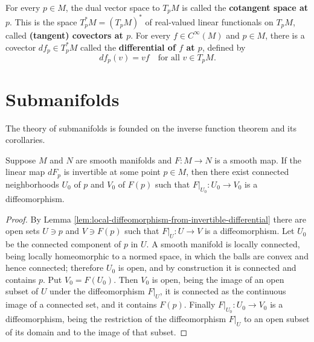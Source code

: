 For every $p \in M$, the dual vector space to $T_p M$ is called the \textbf{cotangent space at $p$}. This is the space $T_p^* M = (T_p M)^*$ of real-valued linear functionals on $T_p M$, called \textbf{(tangent) covectors at $p$}. For every $f \in C^\infty(M)$ and $p \in M$, there is a covector $df_p \in T_p^* M$ called the \textbf{differential of $f$ at $p$}, defined by
\begin{equation}
df_p(v) = vf \quad \text{for all } v \in T_p M.
\tag{A.4}
\end{equation}

\section{Submanifolds}

The theory of submanifolds is founded on the inverse function theorem and its corollaries.

\begin{theorem}
\label{thm:inverse-function-theorem-manifolds}





Suppose $M$ and $N$ are smooth manifolds and $F: M \to N$ is a smooth map. If the linear map $dF_p$ is invertible at some point $p \in M$, then there exist connected neighborhoods $U_0$ of $p$ and $V_0$ of $F(p)$ such that $F|_{U_0}: U_0 \to V_0$ is a diffeomorphism.
\end{theorem}

\begin{proof}

By Lemma \ref{lem:local-diffeomorphism-from-invertible-differential} there are open sets $U \ni p$ and $V \ni F(p)$ such that $F|_U : U \to V$ is a diffeomorphism. Let $U_0$ be the connected component of $p$ in $U$. A smooth manifold is locally connected, being locally homeomorphic to a normed space, in which the balls are convex and hence connected; therefore $U_0$ is open, and by construction it is connected and contains $p$. Put $V_0 = F(U_0)$. Then $V_0$ is open, being the image of an open subset of $U$ under the diffeomorphism $F|_U$, it is connected as the continuous image of a connected set, and it contains $F(p)$. Finally $F|_{U_0} : U_0 \to V_0$ is a diffeomorphism, being the restriction of the diffeomorphism $F|_U$ to an open subset of its domain and to the image of that subset.
\end{proof}

